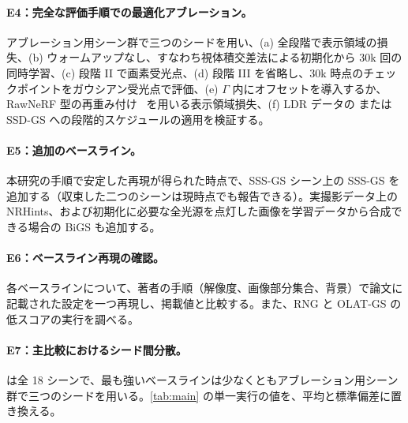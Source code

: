 \documentclass[10pt,twocolumn,letterpaper]{article}
\begin{document}
\paragraph{E4：完全な評価手順での最適化アブレーション。}
アブレーション用シーン群で三つのシードを用い、(a) 全段階で表示領域の損失、(b) ウォームアップなし、すなわち視体積交差法による初期化から 30k 回の同時学習、(c) 段階 II で画素受光点、(d) 段階 III を省略し、30k 時点のチェックポイントをガウシアン受光点で評価、(e) $\Gamma$ 内にオフセットを導入するか、RawNeRF 型の再重み付け~\cite{mildenhall2022nerf} を用いる表示領域損失、(f) LDR データの \gsthree または SSD-GS への段階的スケジュールの適用を検証する。

\paragraph{E5：追加のベースライン。}
本研究の手順で安定した再現が得られた時点で、SSS-GS シーン上の SSS-GS を追加する（収束した二つのシーンは現時点でも報告できる）。実撮影データ上の NRHints、および初期化に必要な全光源を点灯した画像を学習データから合成できる場合の BiGS も追加する。

\paragraph{E6：ベースライン再現の確認。}
各ベースラインについて、著者の手順（解像度、画像部分集合、背景）で論文に記載された設定を一つ再現し、掲載値と比較する。また、RNG と OLAT-GS の低スコアの実行を調べる。

\paragraph{E7：主比較におけるシード間分散。}
\ours は全 18 シーンで、最も強いベースラインは少なくともアブレーション用シーン群で三つのシードを用いる。\cref{tab:main} の単一実行の値を、平均と標準偏差に置き換える。
\end{document}
